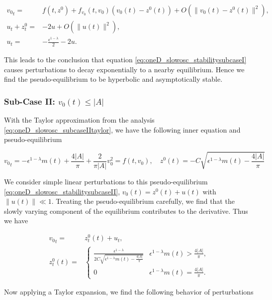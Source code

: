 \begin{equation*}
\begin{aligned}
{v_0}_t =& f(t,z^0)+f_{v_0}(t,v_0)(v_0(t)-z^0(t))+O(\lVert v_0(t)-z^0(t) \rVert^2),\\
u_t+z^0_t=&-2u+O(\lVert u(t)\rVert^2),\\
u_t =&-\frac{\epsilon^{1-\lambda}}{2}-2u.
\end{aligned}
\end{equation*}

This leads to the conclusion that equation \eqref{eq:oneD_slowosc_stabilitysubcaseI} causes perturbations to decay exponentially to a nearby equilibrium. Hence we find the pseudo-equilibrium to be hyperbolic and asymptotically stable.

\subsubsection*{Sub-Case II: $v_0(t)\le |A|$}

With the Taylor approximation from the analysis \eqref{eq:oneD_slowosc_subcaseIItaylor}, we have the following inner equation and pseudo-equilibrium

\begin{equation}\label{eq:oneD_slowosc_stabilitysubcaseII}
{v_0}_t= -\epsilon^{1-\lambda}m(t) +\frac{4|A|}{\pi}+\frac{2}{\pi |A|}v_0^2=f(t,v_0),\quad z^0(t)=-C \sqrt{\epsilon^{1-\lambda}m(t)-\frac{4|A|}{\pi}}
\end{equation}

We consider simple linear perturbations to this pseudo-equilibrium \eqref{eq:oneD_slowosc_stabilitysubcaseII}, $v_0(t)=z^0(t)+u(t)$ with $\lVert u(t) \rVert \ll 1$. Treating the pseudo-equilibrium carefully, we find that the slowly varying component of the equilibrium contributes to the derivative. Thus we have

\begin{equation}
\begin{aligned}
{v_0}_t =& z^0_t(t) +u_t,\\
z^0_t(t) = & \begin{cases}
\frac{\epsilon^{1-\lambda}}{2C\sqrt{\epsilon^{1-\lambda}m(t)-\frac{4|A|}{\pi}}} & \epsilon^{1-\lambda}m(t)> \frac{4|A|}{\pi},\\
0 & \epsilon^{1-\lambda}m(t) =\frac{4|A|}{\pi}.
\end{cases}
\end{aligned}
\end{equation}

Now applying a Taylor expansion, we find the following behavior of perturbations

